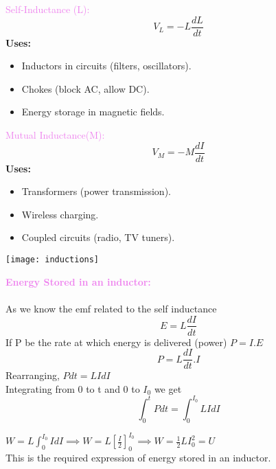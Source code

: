\documentclass{beamer}
\begin{document}
\begin{frame}
\textcolor{violet}{Self-Inductance (L):}\\
\[
 V_L=-L\frac{dL}{dt}
\]
\textbf{Uses:}
\begin{itemize}
\item Inductors in circuits (filters, oscillators).
\item Chokes (block AC, allow DC).
\item Energy storage in magnetic fields.
\end{itemize}
\textcolor{violet}{Mutual Inductance(M):}\\
\[
 V_M=-M\frac{dI}{dt}
\]
\textbf{Uses:}
\begin{itemize}
\item Transformers (power transmission).

\end{itemize}
\end{frame}




\begin{frame}
\begin{itemize}
\item Wireless charging.
\item Coupled circuits (radio, TV tuners).
\end{itemize}
\begin{center}
\texttt{[image: inductions]}
\end{center}
\end{frame}

\begin{frame}
\textcolor{violet}{\textbf{Energy Stored in an inductor:}}\\
\\
As we know the emf related to the self inductance 
\[
E=L\frac{dI}{dt}
\]
If P be the rate at which energy is delivered (power) $P=I.E$
\[
P=L\frac{dI}{dt}.I
\]
Rearranging, $Pdt=L IdI$\\
Integrating from 0 to t and 0 to $I_0$ we get
\[
\int_{0}^{t}Pdt=\int_{0}^{I_0}LIdI
\]

\hspace{1cm} $W=L\int_{0}^{I_0}IdI  \implies W= L[\frac{I}{2}]_{0}^{I_0} \implies W=\frac{1}{2}LI_0^2=U$\\
This is the required expression of energy stored in an inductor.
\end{frame}
\end{document}
